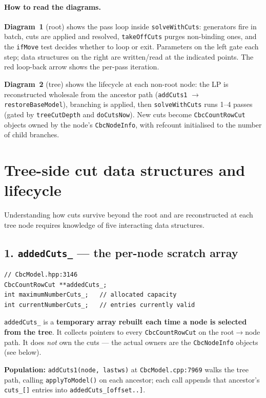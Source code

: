\documentclass[11pt,a4paper]{article}
\begin{document}
\paragraph{How to read the diagrams.}
\textbf{Diagram~1} (root) shows the pass loop inside
\texttt{solveWithCuts}: generators fire in batch, cuts are applied
and resolved, \texttt{takeOffCuts} purges non-binding ones, and the
\texttt{ifMove} test decides whether to loop or exit.  Parameters
on the left gate each step; data structures on the right are
written/read at the indicated points.  The red loop-back arrow shows
the per-pass iteration.

\textbf{Diagram~2} (tree) shows the lifecycle at each non-root
node: the LP is reconstructed wholesale from the ancestor path
(\texttt{addCuts1} $\to$ \texttt{restoreBaseModel}), branching is
applied, then \texttt{solveWithCuts} runs 1--4 passes (gated by
\texttt{treeCutDepth} and \texttt{doCutsNow}).  New cuts become
\texttt{CbcCountRowCut} objects owned by the node's
\texttt{CbcNodeInfo}, with refcount initialised to the number of
child branches.

\section{Tree-side cut data structures and lifecycle}
\label{sec:treedata}

Understanding how cuts survive beyond the root and are
reconstructed at each tree node requires knowledge of five
interacting data structures.

\subsection*{1. \texttt{addedCuts\_} --- the per-node scratch array}

\begin{lstlisting}
// CbcModel.hpp:3146
CbcCountRowCut **addedCuts_;
int maximumNumberCuts_;   // allocated capacity
int currentNumberCuts_;   // entries currently valid
\end{lstlisting}

\texttt{addedCuts\_} is a \textbf{temporary array rebuilt each time
a node is selected from the tree}.  It collects pointers to every
\texttt{CbcCountRowCut} on the root$\to$node path.  It does
\emph{not} own the cuts --- the actual owners are the
\texttt{CbcNodeInfo} objects (see below).

\textbf{Population:} \texttt{addCuts1(node, lastws)} at
\texttt{CbcModel.cpp:7969} walks the tree path, calling
\texttt{applyToModel()} on each ancestor; each call appends that
ancestor's \texttt{cuts\_[]} entries into
\texttt{addedCuts\_[offset..]}.
\end{document}
